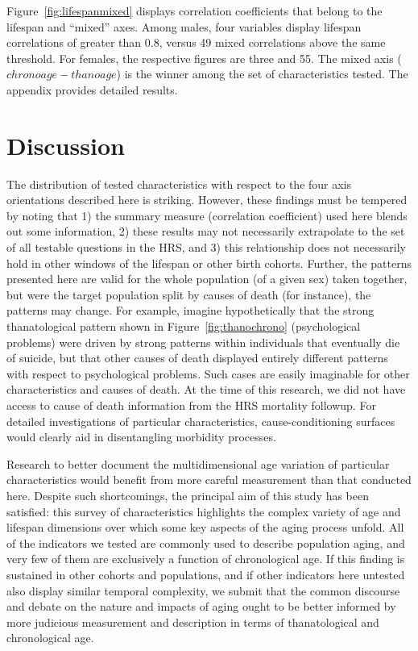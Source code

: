 \documentclass[11pt,oneside]{article} %
\begin{document}
\begin{figure}[!h]
{\begin{subfigure}{.7\textwidth}
	\end{subfigure}
	}
	
\end{figure}

Figure~\ref{fig:lifespanmixed} displays correlation coefficients
that belong to the lifespan and ``mixed'' axes. Among males, four variables
display lifespan correlations of greater than 0.8, versus 49 mixed correlations above
the same threshold. For females, the respective figures are three and 55. The
mixed axis ($chrono age - thano age$) is the winner among the set of
characteristics tested. The appendix provides detailed results. 

\section*{Discussion}
The distribution of tested characteristics with respect to the
four axis orientations described here is striking. However, these findings
must be tempered by noting that 1) the summary measure (correlation coefficient)
used here blends out some information, 2) these results may
not necessarily extrapolate to the set of all testable questions in the HRS, and 3) this relationship does not necessarily hold in other windows of the lifespan or other birth cohorts. Further, the patterns
presented here are valid for the whole population (of a given sex) taken
together, but were the target population split by causes of death (for
instance), the patterns may change. For example, imagine hypothetically that the
strong thanatological pattern shown in Figure~\ref{fig:thanochrono}
(psychological problems) were driven by strong patterns within individuals that
eventually die of suicide, but that other causes of death displayed entirely different patterns with respect to
psychological problems. Such cases are easily imaginable for other
characteristics and causes of death. At the time of this research, we did not
have access to cause of death information from the HRS mortality followup. For
detailed investigations of particular characteristics, cause-conditioning
surfaces would clearly aid in disentangling morbidity processes.

Research to better document the multidimensional age variation of particular
characteristics would benefit from more careful measurement than that conducted
here.
Despite such shortcomings, the principal aim of this study has been satisfied:
this survey of characteristics highlights the complex variety of age and
lifespan dimensions over which some key aspects of the aging process unfold. All
of the indicators we tested are commonly used to describe population aging, and
very few of them are exclusively a function of chronological age. If this
finding is sustained in other cohorts and populations, and if other indicators
here untested also display similar temporal complexity, we submit that the
common discourse and debate on the nature and impacts of aging ought to be
better informed by more judicious measurement and description in terms of
thanatological and chronological age.
\end{document}
